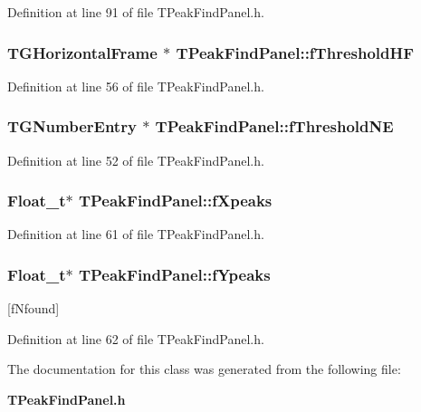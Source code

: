 Definition at line 91 of file TPeakFindPanel.h.

\subsubsection[{fThresholdHF}]{\setlength{\rightskip}{0pt plus 5cm}TGHorizontalFrame $\ast$ {\bf TPeakFindPanel::fThresholdHF}\hspace{0.3cm}{\ttfamily  [private]}}\label{classTPeakFindPanel_a78fef149c7014c9bb22332e6f6acdee1}


Definition at line 56 of file TPeakFindPanel.h.

\subsubsection[{fThresholdNE}]{\setlength{\rightskip}{0pt plus 5cm}TGNumberEntry $\ast$ {\bf TPeakFindPanel::fThresholdNE}\hspace{0.3cm}{\ttfamily  [private]}}\label{classTPeakFindPanel_a3e6b761a943f9531a12d7306d81e9a4f}


Definition at line 52 of file TPeakFindPanel.h.

\subsubsection[{fXpeaks}]{\setlength{\rightskip}{0pt plus 5cm}Float\_\-t$\ast$ {\bf TPeakFindPanel::fXpeaks}\hspace{0.3cm}{\ttfamily  [private]}}\label{classTPeakFindPanel_a608e0abc2668fdec2807029a3de23850}


Definition at line 61 of file TPeakFindPanel.h.

\subsubsection[{fYpeaks}]{\setlength{\rightskip}{0pt plus 5cm}Float\_\-t$\ast$ {\bf TPeakFindPanel::fYpeaks}\hspace{0.3cm}{\ttfamily  [private]}}\label{classTPeakFindPanel_aff0806bd79c6b606fdb13a3bced11359}


[fNfound] 



Definition at line 62 of file TPeakFindPanel.h.



The documentation for this class was generated from the following file:\begin{DoxyCompactItemize}
\item 
{\bf TPeakFindPanel.h}\end{DoxyCompactItemize}
